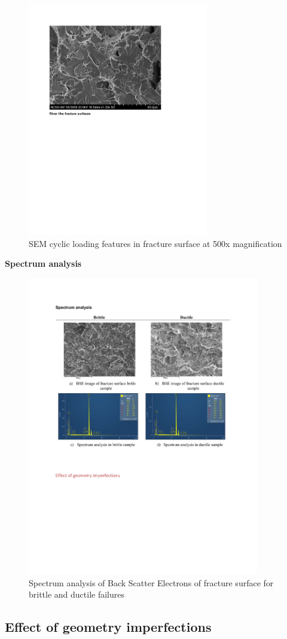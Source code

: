 \begin{figure}[htbp]
	\centering
	\includegraphics[width=0.7\textwidth]{VAC Thesis 2.0/Chapter-4/figs/BBT_RiverFeatures.pdf}
	\caption{SEM cyclic loading features in fracture surface at 500x magnification}
	\label{fig:RiverFeatures}
\end{figure}
\textbf{Spectrum analysis}
\begin{figure}[htbp]
	\centering
	\includegraphics[width=0.9\textwidth]{VAC Thesis 2.0/Chapter-4/figs/BBT_SpectrumAnalysis.pdf}
	\caption{Spectrum analysis of Back Scatter Electrons of fracture surface for brittle and ductile failures}
	\label{fig:SpectrumAnalysis}
\end{figure}
\subsection{Effect of geometry imperfections}